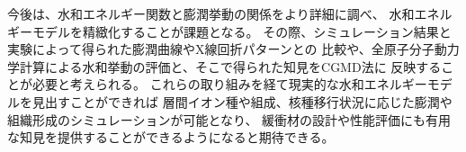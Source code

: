 ﻿\documentclass[11pt,a4j]{jarticle}
\begin{document}
今後は、水和エネルギー関数と膨潤挙動の関係をより詳細に調べ、
水和エネルギーモデルを精緻化することが課題となる。
その際、シミュレーション結果と実験によって得られた膨潤曲線やX線回折パターンとの
比較や、全原子分子動力学計算による水和挙動の評価と、そこで得られた知見をCGMD法に
反映することが必要と考えられる。
これらの取り組みを経て現実的な水和エネルギーモデルを見出すことができれば
層間イオン種や組成、核種移行状況に応じた膨潤や組織形成のシミュレーションが可能となり、
緩衝材の設計や性能評価にも有用な知見を提供することができるようになると期待できる。
%
\end{document}

